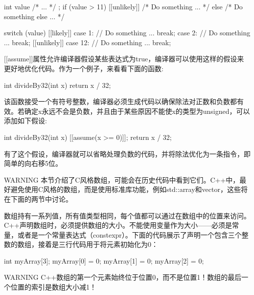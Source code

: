 \begin{cpp}
int value { /* ... */ };
if (value > 11) [[unlikely]] { /* Do something ... */ }
else { /* Do something else ... */ }

switch (value)
{
    [[likely]] case 1:
        // Do something ...
        break;
    case 2:
        // Do something ...
        break;
    [[unlikely]] case 12:
        // Do something ...
        break;
}
\end{cpp}


\mySamllsection{[[assume]]}

[[assume]]属性允许编译器假设某些表达式为true，编译器可以使用这样的假设来更好地优化代码。作为一个例子，来看看下面的函数:

\begin{cpp}
int divideBy32(int x)
{
    return x / 32;
}
\end{cpp}

该函数接受一个有符号整数，编译器必须生成代码以确保除法对正数和负数都有效。若确定x永远不会是负数，并且由于某些原因不能使x的类型为unsigned，可以添加如下假设:

\begin{cpp}
int divideBy32(int x)
{
    [[assume(x >= 0)]];
    return x / 32;
}
\end{cpp}

有了这个假设，编译器就可以省略处理负数的代码，并将除法优化为一条指令，即简单的向右移5位。


\begin{myWarning}{WARNING}
本节介绍了C风格数组，可能会在历史代码中看到它们。C++中，最好避免使用C风格的数组，而是使用标准库功能，例如std::array和vector，这些将在下面的两节中讨论。
\end{myWarning}

数组持有一系列值，所有值类型相同，每个值都可以通过在数组中的位置来访问。C++声明数组时，必须提供数组的大小。不能使用变量作为大小——必须是常量，或者是一个常量表达式（constexpr）。下面的代码展示了声明一个包含三个整数的数组，接着是三行代码用于将元素初始化为0：

\begin{cpp}
int myArray[3];
myArray[0] = 0;
myArray[1] = 0;
myArray[2] = 0;
\end{cpp}

\begin{myWarning}{WARNING}
C++数组的第一个元素始终位于位置0，而不是位置1！数组的最后一个位置的索引是数组大小减1！
\end{myWarning}

